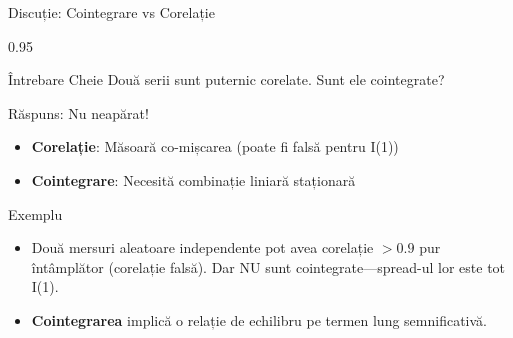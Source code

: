 \documentclass[9pt, aspectratio=169, t]{beamer}
\begin{document}
\begin{frame}{Discuție: Cointegrare vs Corelație}
    \begin{cminipage}{0.95\textwidth}
    {\small
    \begin{alertblock}{Întrebare Cheie}
        Două serii sunt puternic corelate. Sunt ele cointegrate?
    \end{alertblock}
    \begin{block}{Răspuns: Nu neapărat!}
        \begin{itemize}\setlength{\itemsep}{0pt}
            \item \textbf{Corelație}: Măsoară co-mișcarea (poate fi falsă pentru I(1))
            \item \textbf{Cointegrare}: Necesită combinație liniară staționară
        \end{itemize}
    \end{block}
    \begin{exampleblock}{Exemplu}
        \begin{itemize}\setlength{\itemsep}{0pt}
            \item Două mersuri aleatoare independente pot avea corelație $> 0.9$ pur întâmplător (corelație falsă). Dar NU sunt cointegrate---spread-ul lor este tot I(1).
            \item \textbf{Cointegrarea} implică o relație de echilibru pe termen lung semnificativă.
        \end{itemize}
    \end{exampleblock}
    }
    \end{cminipage}
\end{frame}
\end{document}
